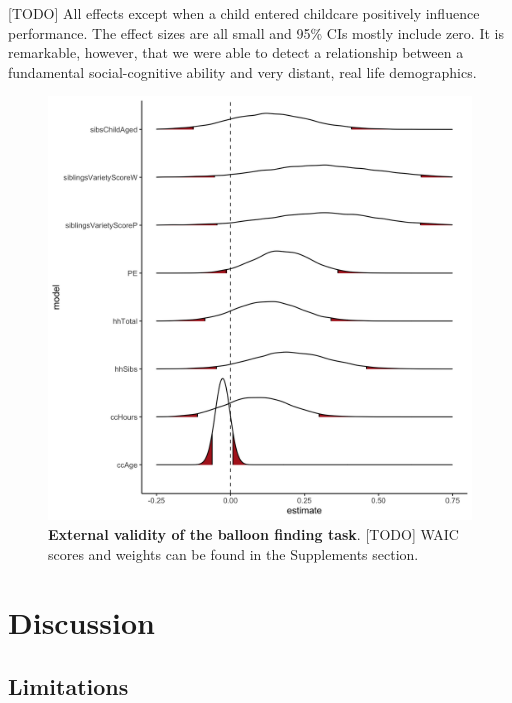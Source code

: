 \documentclass[
  man,floatsintext]{apa6}
\begin{document}
{[}TODO{]} All effects except when a child entered childcare positively influence performance.
The effect sizes are all small and 95\% CIs mostly include zero. It is remarkable, however, that we were able to detect a relationship between a fundamental social-cognitive ability and very distant, real life demographics.




\begin{figure}

{\centering \includegraphics[width=1\linewidth]{../figures/extvali-posteriorsample} 

}

\caption{\textbf{External validity of the balloon finding task}.
{[}TODO{]} WAIC scores and weights can be found in the Supplements section.}\label{fig:fig4}
\end{figure}

\hypertarget{discussion-2}{%
\section{Discussion}\label{discussion-2}}

\hypertarget{limitations}{%
\subsection{Limitations}\label{limitations}}
\end{document}

